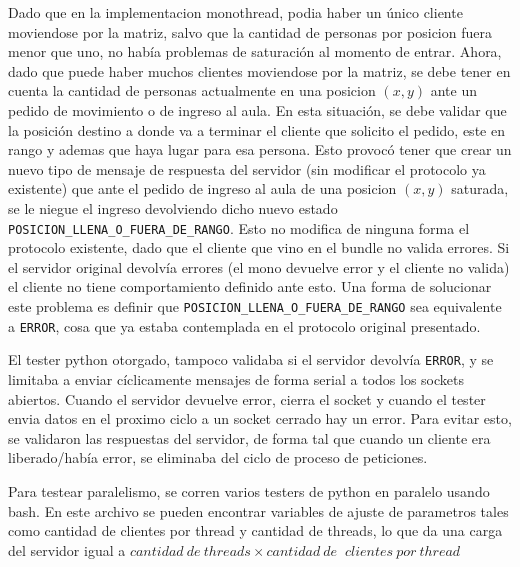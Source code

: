 Dado que en la implementacion monothread, podia haber un \'unico cliente moviendose por la matriz, salvo que la cantidad de personas por posicion fuera menor que uno, no hab\'ia problemas de saturaci\'on al momento de entrar. Ahora, dado que puede haber muchos clientes moviendose por la matriz, se debe tener en cuenta la cantidad de personas actualmente en una posicion $(x,y)$ ante un pedido de movimiento o de ingreso al aula. En esta situaci\'on, se debe validar que la posici\'on destino a donde va a terminar el cliente que solicito el pedido, este en rango y ademas que haya lugar para esa persona. Esto provoc\'o tener que crear un nuevo tipo de mensaje de respuesta del servidor (sin modificar el protocolo ya existente) que ante el pedido de ingreso al aula de una posicion $(x,y)$ saturada, se le niegue el ingreso devolviendo dicho nuevo estado \verb|POSICION_LLENA_O_FUERA_DE_RANGO|. Esto no modifica de ninguna forma el protocolo existente, dado que el cliente que vino en el bundle no valida errores. Si el servidor original devolv\'ia errores (el mono devuelve error y el cliente no valida) el cliente no tiene comportamiento definido ante esto. Una forma de solucionar este problema es definir que \verb|POSICION_LLENA_O_FUERA_DE_RANGO| sea equivalente a \verb|ERROR|, cosa que ya estaba contemplada en el protocolo original presentado.

El tester python otorgado, tampoco validaba si el servidor devolv\'ia \verb|ERROR|, y se limitaba a enviar c\'iclicamente mensajes de forma serial a todos los sockets abiertos. Cuando el servidor devuelve error, cierra el socket y cuando el tester envia datos en el proximo ciclo a un socket cerrado hay un error. Para evitar esto, se validaron las respuestas del servidor, de forma tal que cuando un cliente era liberado/hab\'ia error, se eliminaba del ciclo de proceso de peticiones.

Para testear paralelismo, se corren varios testers de python en paralelo usando bash. En este archivo se pueden encontrar variables de ajuste de parametros tales como cantidad de clientes por thread y cantidad de threads, lo que da una carga del servidor igual a $cantidad\ de\ threads \times cantidad\ de$ $\ clientes\ por\ thread$